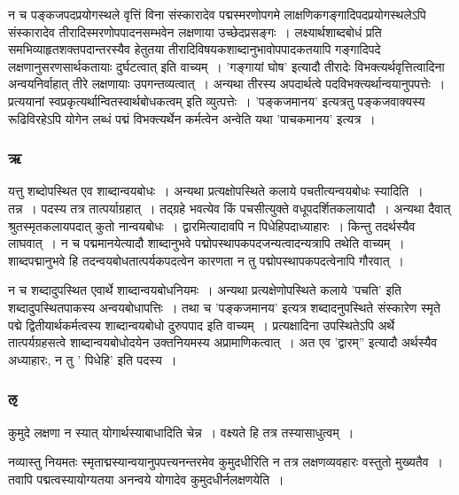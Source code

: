 				न च पङ्कजपदप्रयोगस्थले  वृत्तिं विना संस्कारादेव पद्मस्मरणोपगमे लाक्षणिकगङ्गादिपदप्रयोगस्थलेऽपि संस्कारादेव तीरादिस्मरणोपपादनसम्भवेन लक्षणाया उच्छेदप्रसङ्गः~।  लक्ष्यार्थशाब्दबोधं प्रति समभिव्याहृतशक्तपदान्तरस्यैव हेतुतया तीरादिविषयकशाब्दानुभावोपपादकतयापि गङ्गादिपदे लक्षणानुसरणसार्थकतायाः दुर्घटत्वात् इति वाच्यम्~। ’गङ्गायां घोष’ इत्यादौ तीरादेः विभक्त्यर्थवृत्तित्वादिना अन्वयनिर्वाहात् तीरे लक्षणायाः उपगन्तव्यत्वात्~।  अन्यथा तीरस्य अपदार्थत्वे पदविभक्त्यर्थान्वयानुपपत्तेः~।  प्रत्ययानां स्वप्रकृत्यर्थान्वितस्वार्थबोधकत्वम् इति व्युत्पत्तेः~।  ’पङ्कजमानय’ इत्यत्रतु पङ्कजवाक्यस्य रूढिविरहेऽपि योगेन लब्धं पद्मं विभक्त्यर्थेन कर्मत्वेन अन्वेति यथा ’पाचकमानय’ इत्यत्र~।
	
			\subsubsection{ऋ}
			
				\begin{small}
				
					यत्तु शब्दोपस्थित एव शाब्दान्वयबोधः~। अन्यथा प्रत्यक्षोपस्थिते कलाये पचतीत्यन्वयबोधः स्यादिति~। तन्न~। पदस्य तत्र तात्पर्याग्रहात्~। तद्ग्रहे भवत्येव किं पचसीत्युक्ते वधूपदर्शितकलायादौ~। अन्यथा दैवात् श्रुतस्मृतकलायपदात् कुतो नान्वयबोधः~। द्वारमित्यादावपि न पिधेहिपदाध्याहारः~। किन्तु तदर्थस्यैव लाघवात्~। न च पद्ममानयेत्यादौ शाब्दानुभवे पद्मोपस्थापकपदजन्यत्वादन्यत्रापि तथेति वाच्यम्~। शाब्दपद्मानुभवे हि तदन्वयबोधतात्पर्यकपदत्वेन कारणता न तु पद्मोपस्थापकपदत्वेनापि गौरवात्~। 
				\end{small}
			
				न च शब्दादुपस्थित एवार्थे शाब्दान्वयबोधनियमः~।  अन्यथा प्रत्यक्षेणोपस्थिते  कलाये ’पचति’ इति शब्दादुपस्थितपाकस्य अन्वयबोधापत्तिः~।  तथा च ’पङ्कजमानय’ इत्यत्र  शब्दादनुपस्थिते संस्कारेण स्मृते पद्मे द्वितीयार्थकर्मत्वस्य शाब्दान्वयबोधो दुरुपपाद इति वाच्यम्~। प्रत्यक्षादिना उपस्थितेऽपि अर्थे तात्पर्यग्रहसत्वे शाब्दान्वयबोधोदयेन उक्तनियमस्य अप्रामाणिकत्वात्~। अत एव ’द्वारम्” इत्यादौ अर्थस्यैव  अध्याहारः, न तु ’ पिधेहि’ इति पदस्य~।
			
			\subsubsection{ऌ}

				\begin{small}
				
					कुमुदे लक्षणा न स्यात् योगार्थस्याबाधादिति चेन्न~। वक्ष्यते हि तत्र तस्यासाधुत्वम्~। 
	
					नव्यास्तु नियमतः स्मृताद्मस्यान्वयानुपपत्त्यनन्तरमेव कुमुदधीरिति न तत्र लक्षणव्यवहारः वस्तुतो मुख्यतैव~। तवापि पद्मत्वस्यायोग्यतया अनन्वये योगादेव कुमुदधीर्नलक्षणयेति~। 
				\end{small}

